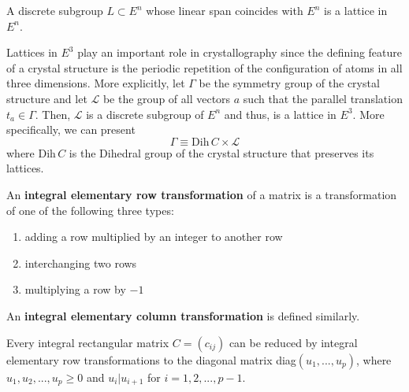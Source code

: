   \begin{corollary}
    A discrete subgroup $L \subset E^n$ whose linear span coincides with $E^n$ is a lattice in $E^n$. 
  \end{corollary}

  Lattices in $E^3$ play an important role in crystallography since the defining feature of a crystal structure is the periodic repetition of the configuration of atoms in all three dimensions. More explicitly, let $\Gamma$ be the symmetry group of the crystal structure and let $\mathcal{L}$ be the group of all vectors $a$ such that the parallel translation $t_a \in \Gamma$. Then, $\mathcal{L}$ is a discrete subgroup of $E^n$ and thus, is a lattice in $E^3$. More specifically, we can present 
  \begin{equation}
    \Gamma \equiv \text{Dih}\,C \times \mathcal{L}
  \end{equation}
  where Dih$\, C$ is the Dihedral group of the crystal structure that preserves its lattices. 

  \begin{definition}
    An \textbf{integral elementary row transformation} of a matrix is a transformation of one of the following three types: 
    \begin{enumerate}
      \item adding a row multiplied by an integer to another row
      \item interchanging two rows
      \item multiplying a row by $-1$ 
    \end{enumerate}
    An \textbf{integral elementary column transformation} is defined similarly. 
  \end{definition}

  \begin{proposition}
    Every integral rectangular matrix $C = (c_{i j})$ can be reduced by integral elementary row transformations to the diagonal matrix diag$(u_1, ..., u_p)$, where $u_1, u_2, ..., u_p \geq 0$ and $u_i | u_{i+1}$ for $i = 1, 2, ..., p -1$. 
  \end{proposition}

